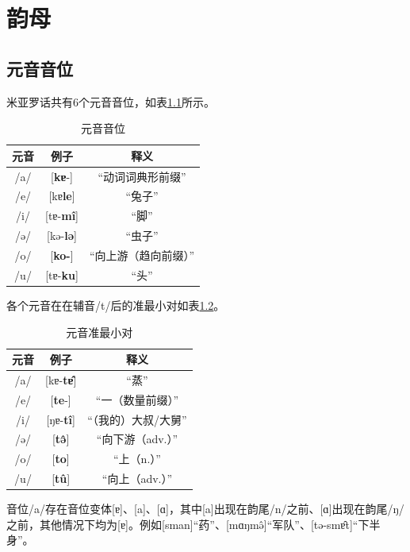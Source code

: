 \chapter{韵母}

\section{元音音位}

米亚罗话共有6个元音音位，如表\ref{vowel}所示。

\begin{table}[H]
\vspace{5pt}
    \centering
    \caption{元音音位}
    \label{vowel}
\begin{tabular}{ccc}
   \toprule
    元音 & 例子 & 释义 \\
   \midrule
   /a/ & [\textbf{kɐ}-] & “动词词典形前缀”  \\
   /e/ & [kɐ\textbf{le}] & “兔子”  \\
   /i/ & [tɐ-\textbf{mî}] & “脚”  \\
   /ə/ & [kə-\textbf{lə}] & “虫子”  \\
   /o/ & [\textbf{ko-}] & “向上游（趋向前缀）”  \\
   /u/ & [tɐ-\textbf{ku}] & “头”  \\
   \bottomrule
\end{tabular}
\end{table}

各个元音在在辅音/t/后的准最小对如表\ref{vowelcon}。

\begin{table}[H]
\vspace{5pt}
    \centering
    \caption{元音准最小对}
    \label{vowelcon}
\begin{tabular}{ccc}
   \toprule
    元音 & 例子 & 释义 \\
   \midrule
   /a/ & [kɐ-\textbf{tɐ̂}] & “蒸”  \\
   /e/ & [\textbf{te}-] & “一（数量前缀）”  \\
   /i/ & [ŋɐ-\textbf{tî}] & “（我的）大叔/大舅”  \\
   /ə/ & [\textbf{tə̂}] & “向下游（adv.）”  \\
   /o/ & [\textbf{to}] & “上（n.）”  \\
   /u/ & [\textbf{tû}] & “向上（adv.）”  \\
   \bottomrule
\end{tabular}
\end{table}

音位/a/存在音位变体[ɐ]、[a]、[ɑ]，其中[a]出现在韵尾/n/之前、[ɑ]出现在韵尾/ŋ/之前，其他情况下均为[ɐ]。例如[sman]“药”、[mɑŋmə̂]“军队”、[tə-smɐ̂t]“下半身”。

